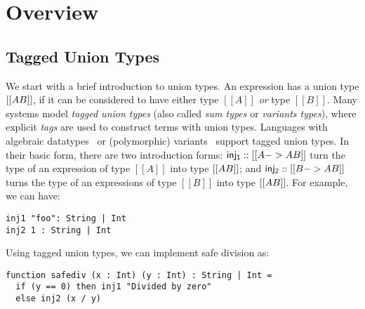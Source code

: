 \section{Overview}
\label{sec:overview}


\subsection{Tagged Union Types}


We start with a brief introduction to union types. An expression has a union
type $[[A\/B]]$, if it can be considered to have either type $[[A]]$ \textit{or}
type $[[B]]$. Many systems model \textit{tagged union types} (also called
\textit{sum types} or \textit{variants types}), where explicit \textit{tags}
are used to construct terms with union types. Languages with algebraic datatypes~\cite{}
or (polymorphic) variants~\cite{} support tagged union types. 
In their basic form, there are two introduction forms:
$\mathsf{inj_1} :: [[A -> A \/ B]]$ turn the type of an expression of type
$[[A]]$ into type $[[A \/ B]]$; and $\mathsf{inj_2} :: [[B -> A \/ B]]$
turns the type of an expressions of type $[[B]]$ into type $[[A \/ B]]$.
For example, we can have:

\begin{lstlisting}
inj1 "foo": String | Int
inj2 1 : String | Int
\end{lstlisting}

\noindent Using tagged union types, we can implement safe division as:

\begin{lstlisting}
function safediv (x : Int) (y : Int) : String | Int =
  if (y == 0) then inj1 "Divided by zero"
  else inj2 (x / y)
\end{lstlisting}

